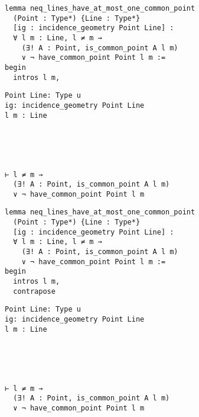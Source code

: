\begin{frame}[fragile]
	\begin{multicols}{2}
		\begin{lstlisting}
lemma neq_lines_have_at_most_one_common_point 
  (Point : Type*) {Line : Type*} 
  [ig : incidence_geometry Point Line] :
  ∀ l m : Line, l ≠ m → 
    (∃! A : Point, is_common_point A l m) 
    ∨ ¬ have_common_point Point l m := 
begin
  intros l m,
\end{lstlisting}
		\columnbreak
		\begin{lstlisting}
Point Line: Type u
ig: incidence_geometry Point Line
l m : Line





⊢ l ≠ m → 
  (∃! A : Point, is_common_point A l m) 
  ∨ ¬ have_common_point Point l m
		\end{lstlisting}
	\end{multicols}
\end{frame}










\begin{frame}[fragile]
	\begin{multicols}{2}
		\begin{lstlisting}
lemma neq_lines_have_at_most_one_common_point 
  (Point : Type*) {Line : Type*} 
  [ig : incidence_geometry Point Line] :
  ∀ l m : Line, l ≠ m → 
    (∃! A : Point, is_common_point A l m) 
    ∨ ¬ have_common_point Point l m := 
begin
  intros l m,
  contrapose
\end{lstlisting}
		\columnbreak
		\begin{lstlisting}
Point Line: Type u
ig: incidence_geometry Point Line
l m : Line





⊢ l ≠ m → 
  (∃! A : Point, is_common_point A l m) 
  ∨ ¬ have_common_point Point l m
		\end{lstlisting}
	\end{multicols}
\end{frame}










